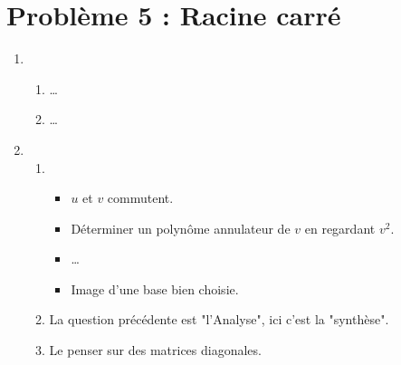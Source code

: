 \documentclass[twoside,french,11pt]{VcCours}
\begin{document}
  
  
  
  

  
\section*{Problème 5 : Racine carré}
  \begin{enumerate}
  \item \begin{enumerate}
  \item \ldots
  \item \ldots
  \end{enumerate}
  \item 
  \begin{enumerate}
  \item 
  \begin{itemize}
  \item $u$ et $v$ commutent.
  \item Déterminer un polynôme annulateur de $v$ en regardant $v^2$.
  \item \ldots
  \item Image d'une base bien choisie.
  \end{itemize}
  \item La question précédente est "l'Analyse", ici c'est la "synthèse".
  \item Le penser sur des matrices diagonales.
  \end{enumerate}
  \end{enumerate}
  
\end{document}
